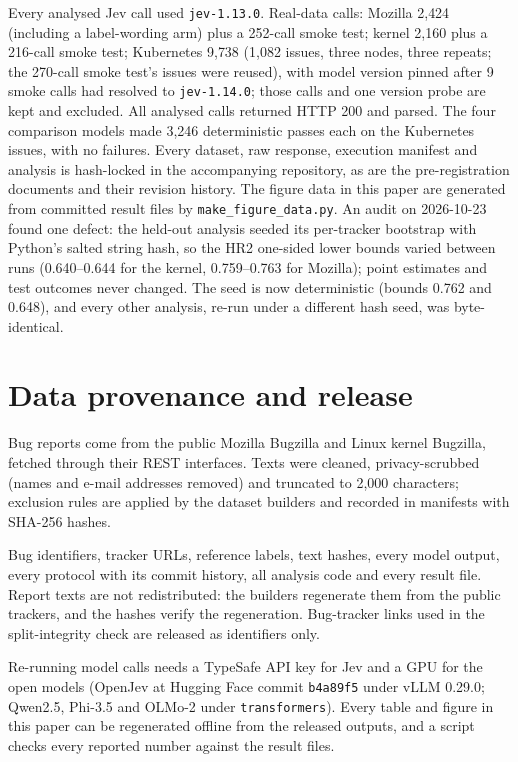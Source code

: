 Every analysed Jev call used \texttt{jev-1.13.0}. Real-data calls:
Mozilla 2{,}424 (including a label-wording arm) plus a 252-call smoke
test; kernel 2{,}160 plus a 216-call smoke test; Kubernetes 9{,}738
(1{,}082 issues, three nodes, three repeats; the 270-call smoke test's
issues were reused), with model version pinned after 9 smoke calls had
resolved to \texttt{jev-1.14.0}; those calls and one version probe are
kept and excluded. All analysed calls returned HTTP 200 and parsed. The
four comparison models made 3{,}246 deterministic passes each on the
Kubernetes issues, with no failures.
Every dataset, raw response, execution manifest and analysis is
hash-locked in the accompanying repository, as are the pre-registration
documents and their revision history. The figure data in this paper are
generated from committed result files by \texttt{make\_figure\_data.py}.
An audit on 2026-10-23 found one defect: the held-out analysis seeded its
per-tracker bootstrap with Python's salted string hash, so the HR2
one-sided lower bounds varied between runs (0.640--0.644 for the kernel,
0.759--0.763 for Mozilla); point estimates and test outcomes never changed.
The seed is now deterministic (bounds 0.762 and 0.648), and every other
analysis, re-run under a different hash seed, was byte-identical.

\section{Data provenance and release}

 Bug reports come from the public Mozilla Bugzilla and
Linux kernel Bugzilla, fetched through their REST interfaces. Texts were
cleaned, privacy-scrubbed (names and e-mail addresses removed) and
truncated to 2{,}000 characters; exclusion rules are applied by the
dataset builders and recorded in manifests with SHA-256 hashes.

 Bug identifiers, tracker URLs, reference labels,
text hashes, every model output, every protocol with its commit history,
all analysis code and every result file. Report texts are not
redistributed: the builders regenerate them from the public trackers, and
the hashes verify the regeneration. Bug-tracker links used in the
split-integrity check are released as identifiers only.

 Re-running model calls needs a TypeSafe API key
for Jev and a GPU for the open models (OpenJev at Hugging Face commit
\texttt{b4a89f5} under vLLM 0.29.0; Qwen2.5, Phi-3.5 and OLMo-2 under
\texttt{transformers}). Every table and figure in this paper can be
regenerated offline from the released outputs, and a script checks every
reported number against the result files.

